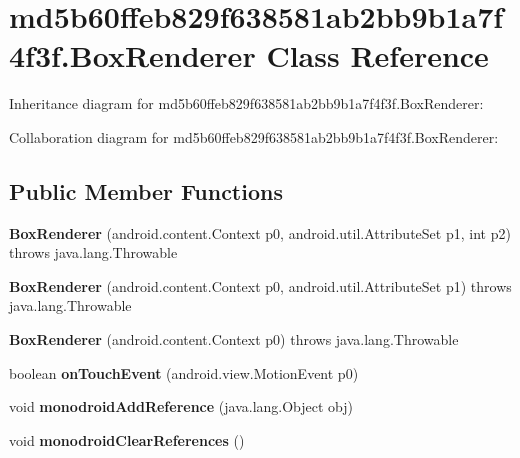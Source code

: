 \hypertarget{classmd5b60ffeb829f638581ab2bb9b1a7f4f3f_1_1_box_renderer}{}\section{md5b60ffeb829f638581ab2bb9b1a7f4f3f.\+Box\+Renderer Class Reference}
\label{classmd5b60ffeb829f638581ab2bb9b1a7f4f3f_1_1_box_renderer}


Inheritance diagram for md5b60ffeb829f638581ab2bb9b1a7f4f3f.\+Box\+Renderer\+:


Collaboration diagram for md5b60ffeb829f638581ab2bb9b1a7f4f3f.\+Box\+Renderer\+:
\subsection*{Public Member Functions}
\begin{DoxyCompactItemize}
\item 
\mbox{\label{classmd5b60ffeb829f638581ab2bb9b1a7f4f3f_1_1_box_renderer_aed7df0c4a87dc8a3d6e9de801d7dc37a}} 
{\bfseries Box\+Renderer} (android.\+content.\+Context p0, android.\+util.\+Attribute\+Set p1, int p2)  throws java.\+lang.\+Throwable 	
\item 
\mbox{\label{classmd5b60ffeb829f638581ab2bb9b1a7f4f3f_1_1_box_renderer_a6500633c0eb2247796670cf8d19b41c0}} 
{\bfseries Box\+Renderer} (android.\+content.\+Context p0, android.\+util.\+Attribute\+Set p1)  throws java.\+lang.\+Throwable 	
\item 
\mbox{\label{classmd5b60ffeb829f638581ab2bb9b1a7f4f3f_1_1_box_renderer_a2b1771eeb58746c23b513587c18ea9de}} 
{\bfseries Box\+Renderer} (android.\+content.\+Context p0)  throws java.\+lang.\+Throwable 	
\item 
\mbox{\label{classmd5b60ffeb829f638581ab2bb9b1a7f4f3f_1_1_box_renderer_a7dbb553b416a3c1e05c3c31699665a75}} 
boolean {\bfseries on\+Touch\+Event} (android.\+view.\+Motion\+Event p0)
\item 
\mbox{\label{classmd5b60ffeb829f638581ab2bb9b1a7f4f3f_1_1_box_renderer_a2c691e6eae3cfe1b2cfe9fbee3e51baf}} 
void {\bfseries monodroid\+Add\+Reference} (java.\+lang.\+Object obj)
\item 
\mbox{\label{classmd5b60ffeb829f638581ab2bb9b1a7f4f3f_1_1_box_renderer_a2f64a02b513057089e1099ba75855aa2}} 
void {\bfseries monodroid\+Clear\+References} ()
\end{DoxyCompactItemize}
